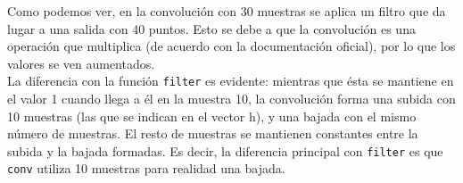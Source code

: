 \documentclass[11pt,a4paper]{article}
\begin{document}
Como podemos ver, en la convolución con 30 muestras se aplica un filtro que da lugar a una salida con 40 puntos. Esto se debe a que la convolución es una operación que multiplica (de acuerdo con la documentación oficial), por lo que los valores se ven aumentados.\\

La diferencia con la función \texttt{filter} es evidente: mientras que ésta se mantiene en el valor 1 cuando llega a él en la muestra 10, la convolución forma una subida con 10 muestras (las que se indican en el vector h), y una bajada con el mismo número de muestras. El resto de muestras se mantienen constantes entre la subida y la bajada formadas. Es decir, la diferencia principal con \texttt{filter} es que \texttt{conv} utiliza 10 muestras para realidad una bajada.
\end{document}
